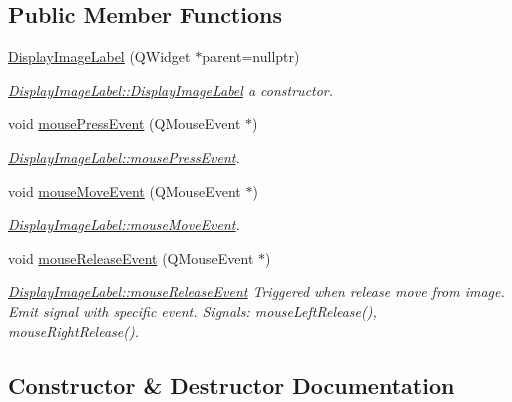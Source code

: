 \subsection*{Public Member Functions}
\begin{DoxyCompactItemize}
\item 
\mbox{\hyperlink{class_display_image_label_a023a6fadb58091ad0387a89d5cdcaa68}{Display\+Image\+Label}} (Q\+Widget $\ast$parent=nullptr)
\begin{DoxyCompactList}\small\item\em \mbox{\hyperlink{class_display_image_label_a023a6fadb58091ad0387a89d5cdcaa68}{Display\+Image\+Label\+::\+Display\+Image\+Label}} a constructor. \end{DoxyCompactList}\item 
void \mbox{\hyperlink{class_display_image_label_a9203c5c07c3dbf97fc39ed43df1960ff}{mouse\+Press\+Event}} (Q\+Mouse\+Event $\ast$)
\begin{DoxyCompactList}\small\item\em \mbox{\hyperlink{class_display_image_label_a9203c5c07c3dbf97fc39ed43df1960ff}{Display\+Image\+Label\+::mouse\+Press\+Event}}. \end{DoxyCompactList}\item 
void \mbox{\hyperlink{class_display_image_label_a471b3a2351a87d421d647fd7fbc3211e}{mouse\+Move\+Event}} (Q\+Mouse\+Event $\ast$)
\begin{DoxyCompactList}\small\item\em \mbox{\hyperlink{class_display_image_label_a471b3a2351a87d421d647fd7fbc3211e}{Display\+Image\+Label\+::mouse\+Move\+Event}}. \end{DoxyCompactList}\item 
void \mbox{\hyperlink{class_display_image_label_a6a429fc2e4da12751f0f0c21300a9e30}{mouse\+Release\+Event}} (Q\+Mouse\+Event $\ast$)
\begin{DoxyCompactList}\small\item\em \mbox{\hyperlink{class_display_image_label_a6a429fc2e4da12751f0f0c21300a9e30}{Display\+Image\+Label\+::mouse\+Release\+Event}} Triggered when release move from image. Emit signal with specific event. Signals\+: mouse\+Left\+Release(), mouse\+Right\+Release(). \end{DoxyCompactList}\end{DoxyCompactItemize}


\subsection{Constructor \& Destructor Documentation}
\mbox{\label{class_display_image_label_a023a6fadb58091ad0387a89d5cdcaa68}} 

